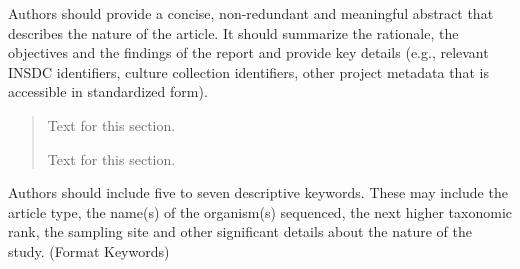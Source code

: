 \documentclass{bmcart}
\begin{document}
\begin{frontmatter}
\begin{fmbox}
\begin{artnotes}
\end{artnotes}

\end{fmbox}%


\begin{abstractbox}
  Authors should provide a concise, non-redundant and meaningful abstract that describes the nature of the article. It should summarize the rationale, the objectives and the findings of the report and provide key details (e.g.,  relevant INSDC identifiers, culture collection identifiers, other project metadata that is accessible in standardized form).
\begin{abstract} %
Text for this section.

Text for this section.
\end{abstract}


Authors should include five to seven descriptive keywords. These may include the article type, the name(s) of the organism(s) sequenced, the next higher taxonomic rank, the sampling site and other significant details about the nature of the study. (Format Keywords)

\begin{keyword}
\end{keyword}


\end{abstractbox}
%

\end{frontmatter}
\end{document}
